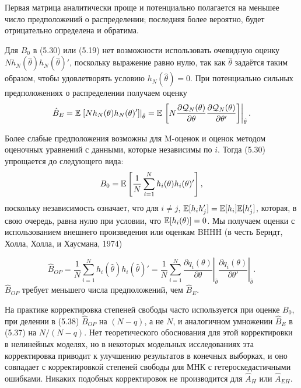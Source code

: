 Первая матрица аналитически проще и потенциально полагается на меньшее число предположений о распределении; последняя более вероятно, будет отрицательно определена и обратима.

Для $B_0$ в (5.30) или (5.19) нет возможности использовать очевидную оценку $Nh_{N}(\hat{\theta})h_{N}(\hat{\theta})'$, поскольку выражение равно нулю, так как $\hat{\theta}$ задаётся таким образом, чтобы удовлетворять условию $h_{N}(\hat{\theta})=0$. При потенциально сильных предположениях о распределении получаем оценку
\begin{equation}
\hat{B}_{E}=\mathbb{E} \left. \left[ Nh_{N}(\theta)h_{N}(\theta)' \right] \right|_{\hat{\theta}}= \mathbb{E} \left. \left[ N \frac{\partial \mathcal{Q}_N(\theta)}{\partial \theta} \frac{\partial \mathcal{Q}_N(\theta)}{\partial \theta'} \right] \right|_{\hat{\theta}}.
\end{equation}

Более слабые предположения возможны для M-оценок и оценок методом оценочных уравнений с данными, которые независимы по $i$. Тогда (5.30) упрощается до следующего вида:
\[
B_0=\mathbb{E} \left[ \frac{1}{N} \sum_{i=1}^{N} h_i(\theta) h_i(\theta)' \right],
\]
поскольку независимость означает, что для $i \not= j$, $\mathbb{E}[h_i h_j']=\mathbb{E}[h_i] \mathbb{E}[h'_j]$, которая, в свою очередь, равна нулю при условии, что $\mathbb{E}[h_i(\theta)]=0$. Мы получаем оценки с использованием внешнего произведения или оценкам BHHH (в честь Берндт, Холла, Холла, и Хаусмана, 1974)

\begin{equation}
\hat{B}_{OP}=  \frac{1}{N} \left. \sum_{i=1}^{N} h_i(\hat{\theta}) h_i(\hat{\theta})'= \frac{1}{N} \sum_{i=1}^{N} \frac{\partial q_i(\theta)}{\partial \theta} \right|_{\hat{\theta}} \left. \frac{\partial q_i(\theta)}{\partial \theta'} \right|_{\hat{\theta}}.
\end{equation}
$\hat{B}_{OP}$ требует меньшего числа предположений, чем $\hat{B}_{E}$.

На практике корректировка степеней свободы часто используется при оценке $B_0$, при
делении в (5.38) $\hat{B}_{OP}$ на $(N-q)$, а не $N$, и аналогичном умножении $\hat{B}_{E}$ в (5.37) на $N/(N-q)$. Нет теоретического обоснования для этой корректировки в нелинейных моделях, но в некоторых модельных исследованиях эта корректировка приводит к улучшению результатов в конечных выборках, и оно совпадает с корректировкой степеней свободы для МНК с гетероскедастичными ошибками. Никаких подобных корректировок не производится для $\hat{A}_H$ или $\hat{A}_{EH}$.

